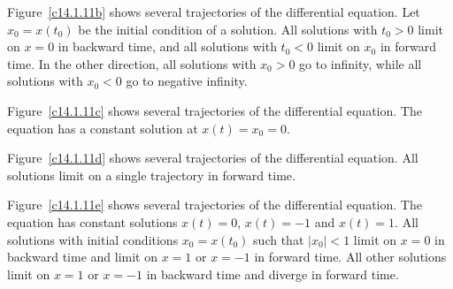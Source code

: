 \begin{figure}[htb]
                       \centerline{%
                       }
\end{figure}

 Figure~\ref{c14.1.11b} shows several trajectories of the
differential equation.  Let $x_0 = x(t_0)$ be the initial condition of
a solution.  All solutions with $t_0 > 0$ limit on $x = 0$ in backward time,
and all solutions with $t_0 < 0$ limit on $x_0$ in forward time.  In the
other direction, all solutions with $x_0 > 0$ go to infinity, while all
solutions with $x_0 < 0$ go to negative infinity.

\begin{figure}[htb]
                       \centerline{%
                       }
\end{figure}

 Figure~\ref{c14.1.11c} shows several trajectories of the
differential equation.  The equation has a constant solution at $x(t)
= x_0 = 0$.

\begin{figure}[htb]
                       \centerline{%
                       }
\end{figure}

 Figure~\ref{c14.1.11d} shows several trajectories of the
differential equation.  All solutions limit on a single trajectory in
forward time.

\begin{figure}[htb]
                       \centerline{%
                       }
\end{figure}

 Figure~\ref{c14.1.11e} shows several trajectories of the
differential equation.  The equation has constant solutions $x(t) = 0$,
$x(t) = -1$ and $x(t) = 1$.  All solutions with initial conditions
$x_0 = x(t_0)$ such that $|x_0| < 1$ limit on $x = 0$ in backward time and
limit on $x = 1$ or $x = -1$ in forward time.  All other solutions limit
on $x = 1$ or $x = -1$ in backward time and diverge in forward time.

\begin{figure}[htb]
                       \centerline{%
                       }
\end{figure}

